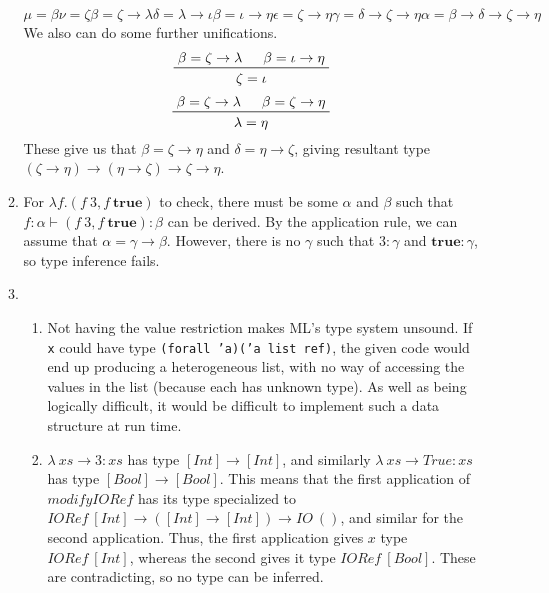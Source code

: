 \documentclass{article}
\begin{document}
\begin{enumerate}
\begin{enumerate}
\begin{displaymath}
{{{{{{                      \mu = \beta
                    }{
                      \nu = \zeta
                    }{
                      \beta = \zeta \to \lambda
                    }
                  }{
                    \delta = \lambda \to \iota
                  }
                }{
                  \beta = \iota \to \eta
                }
              }{
                \epsilon = \zeta \to \eta
              }
            }{
              \gamma = \delta \to \zeta \to \eta
            }
          }{
            \alpha = \beta \to \delta \to \zeta \to \eta
          }
        \end{displaymath}
        We also can do some further unifications.
        \begin{displaymath}
          \prfinterspace=1.5em
          \prftree{
            \beta = \zeta \to \lambda
          }{
            \beta = \iota \to \eta
          }{
            \zeta = \iota
          }
        \end{displaymath}
        \begin{displaymath}
          \prfinterspace=1.5em
          \prftree{
            \beta = \zeta \to \lambda
          }{
            \beta = \zeta \to \eta
          }{
            \lambda = \eta
          }
        \end{displaymath}
        These give us that $\beta = \zeta \to \eta$ and $\delta = \eta \to \zeta$, giving resultant type $(\zeta \to \eta) \to (\eta \to \zeta) \to \zeta \to \eta$.
      \item For $\lambda f. (f~3, f~\mathbf{true})$ to check, there must be some $\alpha$ and $\beta$ such that $f : \alpha \vdash (f~3, f~\mathbf{true}) : \beta$ can be derived. By the application rule, we can assume that $\alpha = \gamma \to \beta$. However, there is no $\gamma$ such that $3 : \gamma$ and $\mathbf{true} : \gamma$, so type inference fails.
      \item
        \begin{enumerate}
          \item Not having the value restriction makes ML's type system unsound. If \texttt{x} could have type \texttt{(forall 'a)('a list ref)}, the given code would end up producing a heterogeneous list, with no way of accessing the values in the list (because each has unknown type). As well as being logically difficult, it would be difficult to implement such a data structure at run time.
          \item $\lambda~xs \to 3 : xs$ has type $[Int] \to [Int]$, and similarly $\lambda~xs \to \mathit{True} : xs$ has type $[Bool] \to [Bool]$. This means that the first application of $\mathit{modifyIORef}$ has its type specialized to $\mathit{IORef}~[Int] \to ([Int] \to [Int]) \to \mathit{IO}~()$, and similar for the second application. Thus, the first application gives $x$ type $\mathit{IORef}~[Int]$, whereas the second gives it type $\mathit{IORef}~[Bool]$. These are contradicting, so no type can be inferred.

\end{enumerate}
\end{enumerate}
\end{enumerate}
\end{document}
